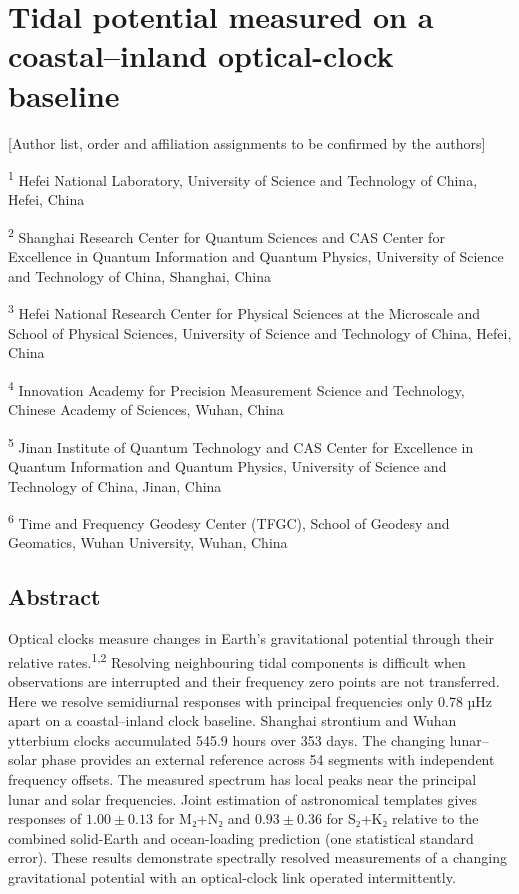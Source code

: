 \documentclass[
  10pt,
  a4paper,
]{article}
\author{}
\date{}
\begin{document}
\hypertarget{tidal-potential-measured-on-a-coastalinland-optical-clock-baseline}{%
\section{Tidal potential measured on a coastal--inland optical-clock
baseline}\label{tidal-potential-measured-on-a-coastalinland-optical-clock-baseline}}

{[}Author list, order and affiliation assignments to be confirmed by the
authors{]}

\textsuperscript{1} Hefei National Laboratory, University of Science and
Technology of China, Hefei, China

\textsuperscript{2} Shanghai Research Center for Quantum Sciences and
CAS Center for Excellence in Quantum Information and Quantum Physics,
University of Science and Technology of China, Shanghai, China

\textsuperscript{3} Hefei National Research Center for Physical Sciences
at the Microscale and School of Physical Sciences, University of Science
and Technology of China, Hefei, China

\textsuperscript{4} Innovation Academy for Precision Measurement Science
and Technology, Chinese Academy of Sciences, Wuhan, China

\textsuperscript{5} Jinan Institute of Quantum Technology and CAS Center
for Excellence in Quantum Information and Quantum Physics, University of
Science and Technology of China, Jinan, China

\textsuperscript{6} Time and Frequency Geodesy Center (TFGC), School of
Geodesy and Geomatics, Wuhan University, Wuhan, China

\hypertarget{abstract}{%
\subsection{Abstract}\label{abstract}}

Optical clocks measure changes in Earth's gravitational potential
through their relative rates.\textsuperscript{1,2} Resolving
neighbouring tidal components is difficult when observations are
interrupted and their frequency zero points are not transferred. Here we
resolve semidiurnal responses with principal frequencies only 0.78 µHz
apart on a coastal--inland clock baseline. Shanghai strontium and Wuhan
ytterbium clocks accumulated 545.9 hours over 353 days. The changing
lunar--solar phase provides an external reference across 54 segments
with independent frequency offsets. The measured spectrum has local
peaks near the principal lunar and solar frequencies. Joint estimation
of astronomical templates gives responses of \(1.00\pm0.13\) for M₂+N₂
and \(0.93\pm0.36\) for S₂+K₂ relative to the combined solid-Earth and
ocean-loading prediction (one statistical standard error). These results
demonstrate spectrally resolved measurements of a changing gravitational
potential with an optical-clock link operated intermittently.
\end{document}

